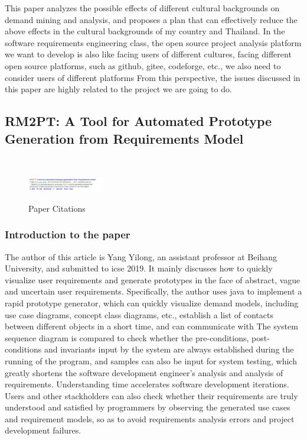 \documentclass[UTF8]{IEEEtran}
\begin{document}
This paper analyzes the possible effects of different cultural backgrounds on demand mining and analysis, and proposes a plan that can effectively reduce the above effects in the cultural backgrounds of my country and Thailand. In the software requirements engineering class, the open source project analysis platform we want to develop is also like facing users of different cultures, facing different open source platforms, such as github, gitee, codeforge, etc., we also need to consider users of different platforms From this perspective, the issues discussed in this paper are highly related to the project we are going to do.

\subsection{RM2PT: A Tool for Automated Prototype Generation from Requirements Model}
\ \\
\begin{figure}[h]
    \centering
    \includegraphics[width=0.3\textwidth]{./img/rm2pt.png}\\
    \caption{\label{fig:iden2}Paper Citations}
\end{figure}

\subsubsection{Introduction to the paper} 
The author of this article\cite{yang2019rm2pt} is Yang Yilong, an assistant professor at Beihang University, and submitted to icse 2019. It mainly discusses how to quickly visualize user requirements and generate prototypes in the face of abstract, vague and uncertain user requirements.
Specifically, the author uses java to implement a rapid prototype generator, which can quickly visualize demand models, including use case diagrams, concept class diagrams, etc., establish a list of contacts between different objects in a short time, and can communicate with The system sequence diagram is compared to check whether the pre-conditions, post-conditions and invariants input by the system are always established during the running of the program, and samples can also be input for system testing, which greatly shortens the software development engineer's analysis and analysis of requirements. Understanding time accelerates software development iterations. Users and other stackholders can also check whether their requirements are truly understood and satisfied by programmers by observing the generated use cases and requirement models, so as to avoid requirements analysis errors and project development failures.
\end{document}
